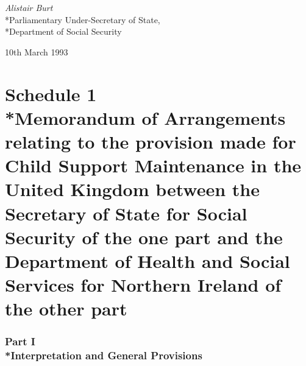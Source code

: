 \documentclass[12pt,a4paper]{article}
\begin{document}
{\raggedleft
\emph{Alistair Burt}\\*Parliamentary Under-Secretary of State,\\*Department of Social Security

}

10th March 1993

\small

\part[Schedule 1 --- Memorandum of Arrangements relating to the provision made for Child Support Maintenance in the United Kingdom between the Secretary of State for Social Security of the one part and the Department of Health and Social Services for Northern Ireland of the other part]{Schedule 1\\*Memorandum of Arrangements relating to the provision made for Child Support Maintenance in the United Kingdom between the Secretary of State for Social Security of the one part and the Department of Health and Social Services for Northern Ireland of the other part}

\section[Part I --- Interpretation and General Provisions]{Part I\\*Interpretation and General Provisions}

\renewcommand\parthead{--- Schedule 1 Part I}
\end{document}

